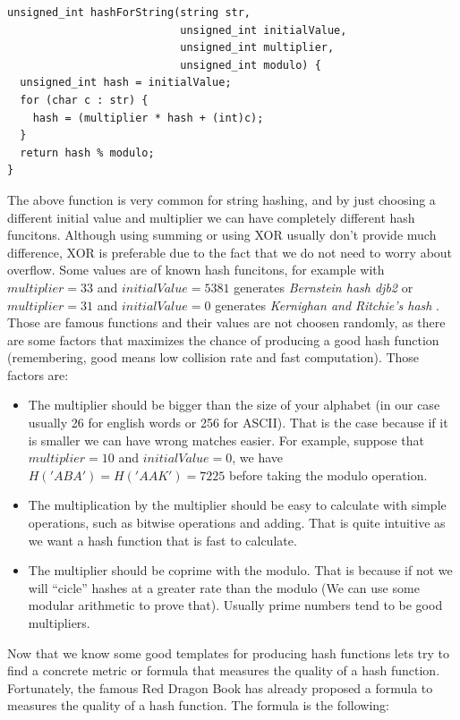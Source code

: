 \begin{lstlisting}
unsigned_int hashForString(string str,
                           unsigned_int initialValue,
                           unsigned_int multiplier,
                           unsigned_int modulo) {
  unsigned_int hash = initialValue;
  for (char c : str) {
    hash = (multiplier * hash + (int)c);
  }
  return hash % modulo;
}
\end{lstlisting}

The above function is very common for string hashing, and by just choosing a different initial value and multiplier we can have completely different hash funcitons. Although using summing or using XOR usually don't provide much difference, XOR is preferable due to the fact that we do not need to worry about overflow. Some values are of known hash funcitons, for example with \( multiplier = 33 \) and \( initialValue = 5381 \) generates \textit{Bernstein hash djb2} \cite{BernsteinHash} or \( multiplier = 31 \) and \( initialValue = 0 \) generates \textit{Kernighan and Ritchie's hash} \cite{KernighanHash}. Those are famous functions and their values are not choosen randomly, as there are some factors that maximizes the chance of producing a good hash function (remembering, good means low collision rate and fast computation). Those factors are:

\begin{itemize}
\item The multiplier should be bigger than the size of your alphabet (in our case usually 26 for english words or 256 for ASCII). That is the case because if it is smaller we can have wrong matches easier. For example, suppose that \( multiplier = 10 \) and \( initialValue = 0 \), we have \( H('ABA') = H('AAK') = 7225 \) before taking the modulo operation.

\item The multiplication by the multiplier should be easy to calculate with simple operations, such as bitwise operations and adding. That is quite intuitive as we want a hash function that is fast to calculate. 

\item The multiplier should be coprime with the modulo. That is because if not we will ``cicle'' hashes at a greater rate than the modulo (We can use some modular arithmetic to prove that). Usually prime numbers tend to be good multipliers.
\end{itemize}

Now that we know some good templates for producing hash functions lets try to find a concrete metric or formula that measures the quality of a hash function. Fortunately, the famous Red Dragon Book \cite{DragonBook} has already proposed a formula to measures the quality of a hash function. The formula is the following:

